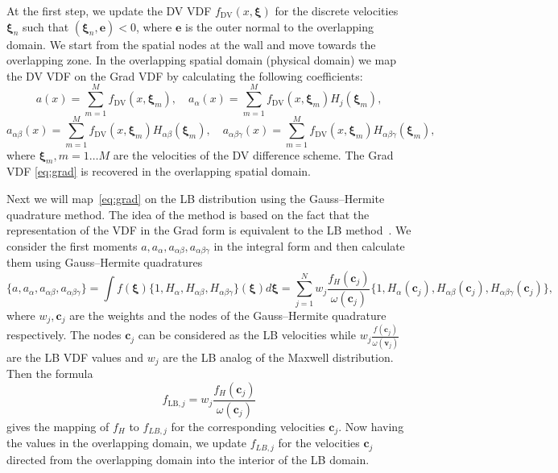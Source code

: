 \documentclass{elsarticle} %
\newcommand{\bxi}{\boldsymbol{\xi}}
\newcommand{\bv}{\boldsymbol{v}}
\newcommand{\bc}{\boldsymbol{c}}
\newcommand{\LB}{\mathrm{LB}}
\newcommand{\DV}{\mathrm{DV}}
\newcommand{\ai}{a_{\alpha}}
\newcommand{\aij}{a_{\alpha\beta}}
\newcommand{\aijk}{a_{\alpha\beta\gamma}}
\newcommand{\Hi}{H_{\alpha}}
\newcommand{\Hij}{H_{\alpha\beta}}
\newcommand{\Hijk}{H_{\alpha\beta\gamma}}
\begin{document}
At the first step, we update the DV VDF $f_\DV(x,\bxi)$ for the discrete velocities $\bxi_n$ such that $(\bxi_n,\mathbf{e})<0$,
where $\mathbf{e}$ is the outer normal to the overlapping domain.
We start from the  spatial nodes at the wall and move towards  the overlapping zone.
In the overlapping spatial domain (physical domain)  we map the DV VDF  on the Grad VDF by calculating the following coefficients:
\begin{equation}
    a(x)=\sum_{m=1}^M f_\DV(x,\bxi_m), \quad \ai(x)=\sum_{m=1}^Mf_\DV(x,\bxi_m)H_j(\bxi_m),
\end{equation}
\begin{equation}
    \aij(x)=\sum_{m=1}^Mf_\DV(x,\bxi_m)\Hij(\bxi_m), \quad
    \aijk(x)=\sum_{m=1}^Mf_\DV(x,\bxi_m)\Hijk(\bxi_m),
\end{equation}
where $\bxi_m, m=1 \ldots M$ are the velocities of the DV difference scheme.
The Grad VDF \eqref{eq:grad} is recovered in the overlapping spatial domain.

Next we will map~\eqref{eq:grad} on the LB distribution using the Gauss--Hermite quadrature method.
The idea of the method is based on the fact that the representation of the VDF in the Grad form
is equivalent to the LB method~\cite{He1997, Shan1998, Shan2006}.
We consider the first moments $a,\ai,\aij, \aijk$ in the integral form and then calculate them using Gauss--Hermite quadratures
\begin{equation}
    \{ a, \ai, \aij, \aijk \}=\int f(\bxi)\{ 1, \Hi, \Hij, \Hijk \}(\bxi)d\bxi =
    \sum_{j=1}^N w_j\frac{f_H(\bc_j)}{\omega(\bc_j)} \{ 1, \Hi(\bc_j), \Hij(\bc_j), \Hijk(\bc_j) \},
\end{equation}
where $w_j, \bc_j$ are the weights and the nodes of the Gauss--Hermite quadrature respectively.
The nodes $\bc_j$ can be considered as the LB velocities while $ w_j\frac{f(\bc_j)}{\omega(\bv_j)}$ are the LB VDF values and
$w_j$ are the LB analog of the Maxwell distribution.  Then the formula
\begin{equation}\label{eq:grad_to_latt}
f_{\LB,j}= w_j\frac{f_H(\bc_j)}{\omega(\bc_j)}
\end{equation}
gives the mapping of $f_H$ to $f_{LB,j}$ for the corresponding velocities $\bc_j$.
Now having the values in the overlapping domain, we update $f_{LB,j}$ for the velocities $\bc_j$
directed from the overlapping domain into the interior of the LB domain.
\end{document}

